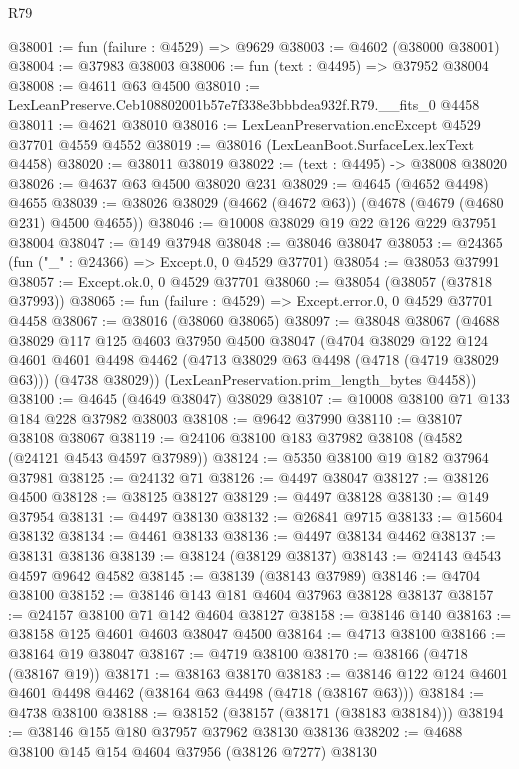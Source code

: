 \begin{lexlean}{R79}
\begin{coremodule}
@38001 := fun (failure : @4529) => @9629
@38003 := @4602 (@38000 @38001)
@38004 := @37983 @38003
@38006 := fun (text : @4495) => @37952 @38004
@38008 := @4611 @63 @4500
@38010 := LexLeanPreserve.Ceb108802001b57e7f338e3bbbdea932f.R79.__fits_0 @4458
@38011 := @4621 @38010
@38016 := LexLeanPreservation.encExcept @4529 @37701 @4559 @4552
@38019 := @38016 (LexLeanBoot.SurfaceLex.lexText @4458)
@38020 := @38011 @38019
@38022 := (text : @4495) -> @38008 @38020
@38026 := @4637 @63 @4500 @38020 @231
@38029 := @4645 (@4652 @4498) @4655
@38039 := @38026 @38029 (@4662 (@4672 @63)) (@4678 (@4679 (@4680 @231) @4500 @4655))
@38046 := @10008 @38029 @19 @22 @126 @229 @37951 @38004
@38047 := @149 @37948
@38048 := @38046 @38047
@38053 := @24365 (fun ("_" : @24366) => Except.{0, 0} @4529 @37701)
@38054 := @38053 @37991
@38057 := Except.ok.{0, 0} @4529 @37701
@38060 := @38054 (@38057 (@37818 @37993))
@38065 := fun (failure : @4529) => Except.error.{0, 0} @4529 @37701 @4458
@38067 := @38016 (@38060 @38065)
@38097 := @38048
    @38067
    (@4688
      @38029
      @117
      @125
      @4603
      @37950
      @4500
      @38047
      (@4704
        @38029
        @122
        @124
        @4601
        @4601
        @4498
        @4462
        (@4713 @38029 @63 @4498 (@4718 (@4719 @38029 @63)))
        (@4738 @38029))
      (LexLeanPreservation.prim_length_bytes @4458))
@38100 := @4645 (@4649 @38047) @38029
@38107 := @10008 @38100 @71 @133 @184 @228 @37982 @38003
@38108 := @9642 @37990
@38110 := @38107 @38108 @38067
@38119 := @24106 @38100 @183 @37982 @38108 (@4582 (@24121 @4543 @4597 @37989))
@38124 := @5350 @38100 @19 @182 @37964 @37981
@38125 := @24132 @71
@38126 := @4497 @38047
@38127 := @38126 @4500
@38128 := @38125 @38127
@38129 := @4497 @38128
@38130 := @149 @37954
@38131 := @4497 @38130
@38132 := @26841 @9715
@38133 := @15604 @38132
@38134 := @4461 @38133
@38136 := @4497 @38134 @4462
@38137 := @38131 @38136
@38139 := @38124 (@38129 @38137)
@38143 := @24143 @4543 @4597 @9642 @4582
@38145 := @38139 (@38143 @37989)
@38146 := @4704 @38100
@38152 := @38146 @143 @181 @4604 @37963 @38128 @38137
@38157 := @24157 @38100 @71 @142 @4604 @38127
@38158 := @38146 @140
@38163 := @38158 @125 @4601 @4603 @38047 @4500
@38164 := @4713 @38100
@38166 := @38164 @19 @38047
@38167 := @4719 @38100
@38170 := @38166 (@4718 (@38167 @19))
@38171 := @38163 @38170
@38183 := @38146 @122 @124 @4601 @4601 @4498 @4462 (@38164 @63 @4498 (@4718 (@38167 @63)))
@38184 := @4738 @38100
@38188 := @38152 (@38157 (@38171 (@38183 @38184)))
@38194 := @38146 @155 @180 @37957 @37962 @38130 @38136
@38202 := @4688 @38100 @145 @154 @4604 @37956 (@38126 @7277) @38130

\end{coremodule}
\end{lexlean}
